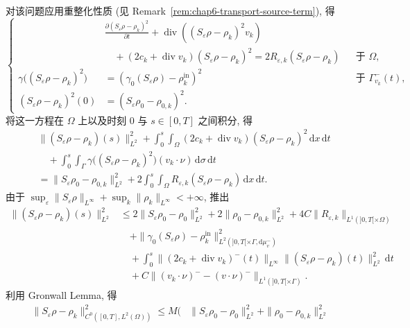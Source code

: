 \begin{sloppypar}
\begin{Proof}
\begin{itemize}
\begin{equation}
 \label{eq:chap6-stability-double-remainder-limit}
 \end{equation}
 对该问题应用重整化性质 (见 Remark~\ref{rem:chap6-transport-source-term}), 得
 \[
 \left\{
 \begin{aligned}
 &\frac{\partial(S_\varepsilon\rho-\rho_k)^2}{\partial t}
 +\operatorname{div}((S_\varepsilon\rho-\rho_k)^2v_k)\\
 &\quad +(2c_k+\operatorname{div}v_k)(S_\varepsilon\rho-\rho_k)^2
 =2R_{\varepsilon,k}(S_\varepsilon\rho-\rho_k)&&\text{于 }\Omega,\\
 \gamma\bigl((S_\varepsilon\rho-\rho_k)^2\bigr)
 &=(\gamma_0(S_\varepsilon\rho)-\rho_k^{\mathrm{in}})^2
 &&\text{于 }\Gamma_{v_k}^-(t),\\
 (S_\varepsilon\rho-\rho_k)^2(0)
 &=(S_\varepsilon\rho_0-\rho_{0,k})^2.
 \end{aligned}
 \right.
 \]
 将这一方程在 $\Omega$ 上以及时刻 $0$ 与 $s\in[0,T]$ 之间积分, 得
 \[
 \begin{aligned}
 &\|(S_\varepsilon\rho-\rho_k)(s)\|_{L^2}^2
 +\int_0^s\int_\Omega(2c_k+\operatorname{div}v_k)
 (S_\varepsilon\rho-\rho_k)^2\,\mathrm dx\,\mathrm dt\\
 &\quad+\int_0^s\int_\Gamma
 \gamma\bigl((S_\varepsilon\rho-\rho_k)^2\bigr)
 (v_k\cdot\nu)\,\mathrm d\sigma\,\mathrm dt\\
 &=\|S_\varepsilon\rho_0-\rho_{0,k}\|_{L^2}^2
 +2\int_0^s\int_\Omega R_{\varepsilon,k}
 (S_\varepsilon\rho-\rho_k)\,\mathrm dx\,\mathrm dt.
 \end{aligned}
 \]
 由于
 $\sup_\varepsilon\|S_\varepsilon\rho\|_{L^\infty}
 +\sup_k\|\rho_k\|_{L^\infty}<+\infty$, 推出
 \[
 \begin{aligned}
 \|(S_\varepsilon\rho-\rho_k)(s)\|_{L^2}^2
 &\leq2\|S_\varepsilon\rho_0-\rho_0\|_{L^2}^2
 +2\|\rho_0-\rho_{0,k}\|_{L^2}^2
 +4C\|R_{\varepsilon,k}\|_{L^1(]0,T[\times\Omega)}\\
 &\quad+\|\gamma_0(S_\varepsilon\rho)-\rho_k^{\mathrm{in}}\|_{L^2(]0,T[\times\Gamma,\mathrm d\mu_v^-)}^2\\
 &\quad+\int_0^s\|(2c_k+\operatorname{div}v_k)^-(t)\|_{L^\infty}
 \|(S_\varepsilon\rho-\rho_k)(t)\|_{L^2}^2\,\mathrm dt\\
 &\quad+C\|(v_k\cdot\nu)^--(v\cdot\nu)^-\|_{L^1(]0,T[\times\Gamma)}.
 \end{aligned}
 \]
 利用 Gronwall Lemma, 得
 \[
 \begin{aligned}
 \|S_\varepsilon\rho-\rho_k\|_{C^0([0,T],L^2(\Omega))}^2
 \leq M\Big(&\|S_\varepsilon\rho_0-\rho_0\|_{L^2}^2
 +\|\rho_0-\rho_{0,k}\|_{L^2}^2

\end{aligned}\]
\end{itemize}
\end{Proof}
\end{sloppypar}
